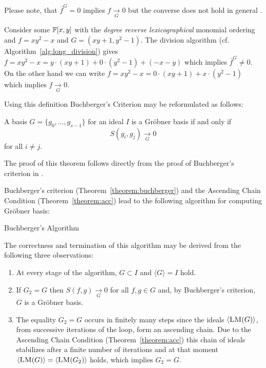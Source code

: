 Please note, that $\overline{f}^G = 0$ implies $f \underset{G}{\longrightarrow} 0$ but the converse does not hold in general \cite[100ff]{Cox2005}. 

\begin{example}
Consider some $\mathbb{F}[x,y]$ with the \emph{degree reverse lexicographical} monomial ordering and $f = xy^2 - x$ and $G= (xy + 1, y^2 - 1)$. The division
algorithm (cf. Algorithm~\ref{alg:long_division}) gives $f = xy^2 - x = y \cdot (xy + 1) + 0 \cdot (y^2 -1) + (-x - y)$ which implies $\overline{f}^G \neq 0$. On the other hand we can write $f = xy^2 - x = 0 \cdot (xy + 1) + x \cdot (y^2 - 1)$ which implies $f\underset{G}{\longrightarrow}0$.
\end{example}

Using this definition Buchberger's Criterion may be reformulated as follows:

\begin{theorem}
\label{thm:groebnerreducestozero}
A basis $G = \{g_0 ,\dots , g_{s-1} \}$ for an ideal $I$ is a Gröbner basis if and only if \[S(g_i,g_j)
\underset{G}{\longrightarrow} 0\]
for all $i \not= j$.
\end{theorem}

The proof of this theorem follows directly from the proof of Buchberger's criterion in \cite{Cox2005}.

Buchberger's criterion (Theorem~\ref{theorem:buchberger}) and the Ascending Chain Condition (Theorem~\ref{theorem:acc}) lead to the following algorithm for
computing Gröbner basis:

\begin{algorithm}[ht]

\caption{Buchberger's Algorithm}
\label{alg:buchberger}
\end{algorithm}


The correctness and termination of this algorithm may be derived from the
following three observations:
\begin{enumerate}
\item At every stage of the algorithm, $G \subset I$ and $\langle G \rangle = I$ hold.
\item If $G_2 = G$ then $S(f, g) \underset{G}{\longrightarrow} 0$ for all $f, g \in G$ and, by Buchberger's criterion, $G$ is a Gröbner basis.
\item The equality $G_2 = G$ occurs in finitely many steps since the ideals $\ideal{\LM(G)}$, from successive iterations of the loop, form an ascending chain. Due to the Ascending Chain Condition (Theorem~\ref{theorem:acc}) this chain of ideals stabilizes after a finite number of iterations and at that moment $\ideal{\LM(G)} = \ideal{\LM(G_2)}$ holds, which implies $G_2 = G$.
\end{enumerate}

